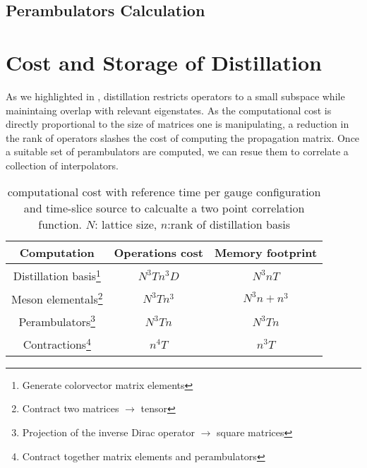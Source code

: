 




\subsection{Perambulators Calculation}

\section{Cost and Storage of Distillation}
      As we highlighted in , distillation restricts operators to a small subspace while mainintaing overlap with relevant eigenstates. As the computational cost is directly proportional to the size of matrices one is manipulating, a reduction in the rank of operators slashes the cost of computing the propagation matrix. Once a suitable set of perambulators are computed, we can resue them to correlate a collection of interpolators.

      \vspace{1em}
       
        \begin{table}
        \begin{minipage}{16cm}
        \hspace*{2em}\begin{tabular}{ccc}
        Computation    & Operations cost & Memory footprint \\ \hline
        Distillation basis\footnote{Generate colorvector matrix elements}& $N^3Tn^3D$         & $N^3nT$      \\
        Meson elementals\footnote{Contract two matrices $\to$ tensor} & $N^3Tn^3$      & $N^3n + n^3$  \\
        Perambulators\footnote{Projection of the inverse Dirac operator $\to$ square matrices} & $N^3Tn$   & $N^3Tn$            \\
        Contractions\footnote{Contract together matrix elements and perambulators}   & $n^4T$    & $n^{3}T$   
        \end{tabular}
        \end{minipage}
        \caption{computational cost with reference time per gauge configuration and time-slice source to calcualte a two point correlation function. $N$: lattice size, $n$:rank of distillation basis}
      \end{table}

